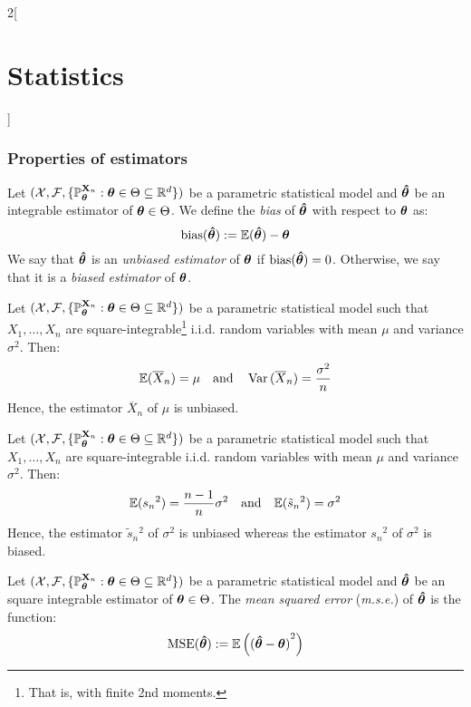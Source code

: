\documentclass[../../../main.tex]{subfiles}
\begin{document}
\begin{multicols}{2}[\section{Statistics}]
  \subsubsection{Properties of estimators}
  \begin{definition}[Bias]
    Let $(\mathcal{X},\mathcal{F},\{\mathbb{P}_{\boldsymbol{\mathrm{\theta}}}^{\boldsymbol{\mathrm{X}}_n}:\boldsymbol{\mathrm{\theta}}\in\Theta\subseteq \mathbb{R}^d\})$ be a parametric statistical model and $\boldsymbol{\mathrm{\hat\theta}}$ be an integrable estimator of $\boldsymbol{\mathrm{\theta}}\in\Theta$. We define the \emph{bias} of $\boldsymbol{\mathrm{\hat\theta}}$ with respect to $\boldsymbol{\mathrm{\theta}}$ as: $$\operatorname{bias}(\boldsymbol{\mathrm{\hat\theta}}):=\mathbb{E}(\boldsymbol{\mathrm{\hat\theta}})-\boldsymbol{\mathrm{\theta}}$$ We say that $\boldsymbol{\mathrm{\hat\theta}}$ is an \emph{unbiased estimator} of $\boldsymbol{\mathrm{\theta}}$ if $\operatorname{bias}(\boldsymbol{\mathrm{\hat\theta}})=0$. Otherwise, we say that it is a \emph{biased estimator} of $\boldsymbol{\mathrm{\theta}}$.
  \end{definition}
  \begin{proposition}
    Let $(\mathcal{X},\mathcal{F},\{\mathbb{P}_{\boldsymbol{\mathrm{\theta}}}^{\boldsymbol{\mathrm{X}}_n}:\boldsymbol{\mathrm{\theta}}\in\Theta\subseteq \mathbb{R}^d\})$ be a parametric statistical model such that $X_1,\ldots,X_n$ are square-integrable\footnote{That is, with finite 2nd moments.} i.i.d. random variables with mean $\mu$ and variance $\sigma^2$. Then: $$\mathbb{E}(\overline{X}_n)=\mu\quad\text{and}\quad\operatorname{Var}{(\overline{X}_n)}=\frac{\sigma^2}{n}$$
    Hence, the estimator $\overline{X}_n$ of $\mu$ is unbiased.
  \end{proposition}
  \begin{proposition}
    Let $(\mathcal{X},\mathcal{F},\{\mathbb{P}_{\boldsymbol{\mathrm{\theta}}}^{\boldsymbol{\mathrm{X}}_n}:\boldsymbol{\mathrm{\theta}}\in\Theta\subseteq \mathbb{R}^d\})$ be a parametric statistical model such that $X_1,\ldots,X_n$ are square-integrable i.i.d. random variables with mean $\mu$ and variance $\sigma^2$. Then: $$\mathbb{E}({s_n}^2)=\frac{n-1}{n}\sigma^2\quad\text{and}\quad\mathbb{E}(\tilde{s}_n{}^2)=\sigma^2$$
    Hence, the estimator $\tilde{s}_n{}^2$ of $\sigma^2$ is unbiased whereas the estimator ${s_n}^2$ of $\sigma^2$ is biased.
  \end{proposition}
  \begin{definition}
    Let $(\mathcal{X},\mathcal{F},\{\mathbb{P}_{\boldsymbol{\mathrm{\theta}}}^{\boldsymbol{\mathrm{X}}_n}:\boldsymbol{\mathrm{\theta}}\in\Theta\subseteq \mathbb{R}^d\})$ be a parametric statistical model and $\boldsymbol{\mathrm{\hat\theta}}$ be an square integrable estimator of $\boldsymbol{\mathrm{\theta}}\in\Theta$. The \emph{mean squared error} (\emph{m.s.e.}) of $\boldsymbol{\mathrm{\hat\theta}}$ is the function: $$\operatorname{MSE}(\boldsymbol{\mathrm{\hat\theta}}):=\mathbb{E}\left({(\boldsymbol{\mathrm{\hat\theta}}-\boldsymbol{\mathrm{\theta}})}^2\right)$$
  \end{definition}
  \begin{proposition}

\end{proposition}
\end{multicols}
\end{document}
